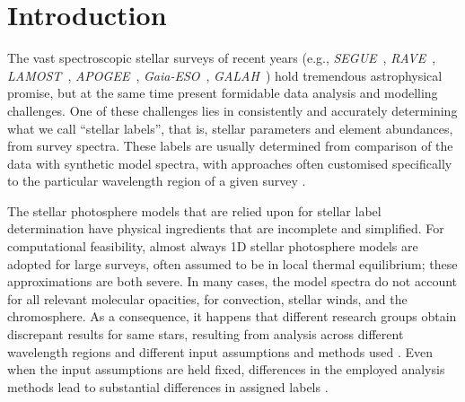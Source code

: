 \documentclass[12pt, preprint]{aastex}
\newcommand{\apogee}{\textsl{APOGEE}}
\newcommand{\galah}{\textsl{GALAH}}
\newcommand{\segue}{\textsl{SEGUE}}
\newcommand{\gaiaeso}{\textsl{Gaia-ESO}}
\newcommand{\rave}{\textsl{RAVE}}
\newcommand{\lamost}{\textsl{LAMOST}}
\begin{document}

\section{Introduction}\label{sec:Intro}

The vast spectroscopic stellar surveys of recent years (e.g., \segue\ \citep{Beers2006}, \rave\ \citep{Steinmetz2006}, \lamost\ \citep{Newberg2012}, \apogee\ \citep{Majewski2012}, \gaiaeso\ \citep{Gilmore2012}, \galah\ \citep{Freeman2012}) hold tremendous astrophysical promise, but at the same time present formidable data analysis and modelling challenges. 
One of these challenges lies in consistently and accurately determining what we call ``stellar labels'', that is, stellar parameters and element abundances, from survey spectra. 
These labels are usually determined from comparison of the data with synthetic model spectra, with approaches often 
customised specifically to the particular wavelength region of a given survey \citep[e.g.,][]{ Lee2006, Boeche2011, Liu2014, Meszaros2013, Sm2014}. 

The stellar photosphere models that are relied upon for stellar label determination have physical ingredients that are incomplete and simplified. 
For computational feasibility, almost always 1D stellar photosphere models are adopted for large surveys, often assumed to be in local thermal equilibrium; these approximations are both severe. 
In many cases, the model spectra do not account for all relevant molecular opacities, for convection, stellar winds, and the chromosphere. 
As a consequence, it happens that different research groups obtain discrepant results for same stars, resulting from analysis across different wavelength regions and different input assumptions and methods used \citep[e.g.,][]{Hinkel2014, Jofre2014, AP1999}. Even when the input assumptions are held fixed, differences in the employed analysis methods lead to substantial differences in assigned labels \citep[e.g.][]{Sm2014}.
\end{document}
